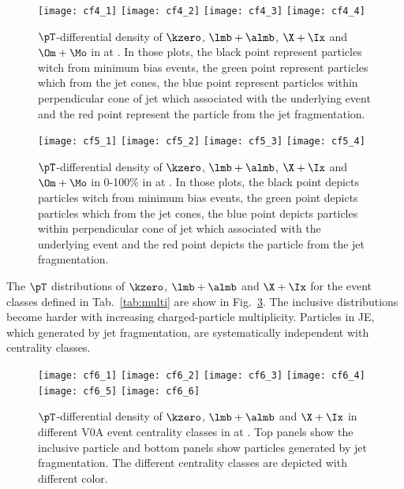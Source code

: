 \begin{figure}[!ht]
	\begin{center}
		\texttt{[image: cf4\_1]}
		\texttt{[image: cf4\_2]}
		\texttt{[image: cf4\_3]}
		\texttt{[image: cf4\_4]}
	\end{center}
	\caption{$\pT$-differential density of $\kzero$, $\lmb + \almb$, $\X + \Ix$ and $\Om + \Mo$ in \pp at \thirteen. In those plots, the black point represent particles witch from minimum bias events, the green point represent particles which from the jet cones, the blue point represent particles within perpendicular cone of jet which associated with the underlying event and the red point represent the particle from the jet fragmentation.}
	\label{fig:ppSpect}
\end{figure}
\begin{figure}[!ht]
	\begin{center}
		\texttt{[image: cf5\_1]}
		\texttt{[image: cf5\_2]}
		\texttt{[image: cf5\_3]}
		\texttt{[image: cf5\_4]}
	\end{center}
	\caption{$\pT$-differential density of $\kzero$, $\lmb + \almb$, $\X + \Ix$ and $\Om + \Mo$ in 0-100\% in \pPb at \fivenn. In those plots, the black point depicts particles witch from minimum bias events, the green point depicts particles which from the jet cones, the blue point depicts particles within perpendicular cone of jet which associated with the underlying event and the red point depicts the particle from the jet fragmentation.}
	\label{fig:pPbSpect}
\end{figure}

The $\pT$ distributions of $\kzero$, $\lmb + \almb$ and $\X + \Ix$ for the event classes defined in Tab.~\ref{tab:multi} are show in Fig.~\ref{fig:pPbSpectwCent}. The inclusive distributions become harder with increasing charged-particle multiplicity. Particles in JE, which generated by jet fragmentation, are systematically independent with centrality classes.
\begin{figure}[!ht]
\begin{center}
	\texttt{[image: cf6\_1]}
	\texttt{[image: cf6\_2]}
	\texttt{[image: cf6\_3]}
	\texttt{[image: cf6\_4]}
	\texttt{[image: cf6\_5]}
	\texttt{[image: cf6\_6]}
\end{center}
\caption{$\pT$-differential density of $\kzero$, $\lmb + \almb$ and $\X + \Ix$ in different V0A event centrality classes in \pPb at \fivenn. Top panels show the inclusive particle and bottom panels show particles generated by jet fragmentation. The different centrality classes are depicted with different color.}
\label{fig:pPbSpectwCent}
\end{figure}

